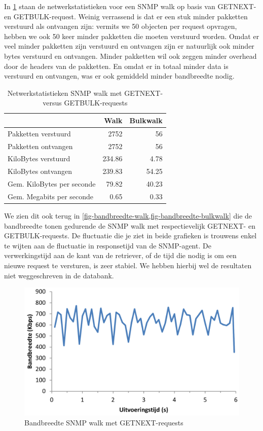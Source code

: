 In \cref{tabel-bandbreedte-walk-vs-bulk} staan de netwerkstatistieken voor een SNMP walk op basis van GETNEXT- en GETBULK-request.
Weinig verrassend is dat er een stuk minder pakketten verstuurd als ontvangen zijn:
vermits we 50 objecten per request opvragen, hebben we ook 50 keer minder pakketten die moeten verstuurd worden.
Omdat er veel minder pakketten zijn verstuurd en ontvangen zijn er natuurlijk ook minder bytes verstuurd en ontvangen.
Minder pakketten wil ook zeggen minder overhead door de headers van de pakketten.
En omdat er in totaal minder data is verstuurd en ontvangen, was er ook gemiddeld minder bandbreedte nodig.


\begin{table}[h]
\centering
\begin{tabular}{@{}lrr@{}}
\toprule
                           & Walk   & Bulkwalk \\ \midrule
Pakketten verstuurd        & 2752   & 56       \\
Pakketten ontvangen        & 2752   & 56       \\
KiloBytes verstuurd        & 234.86 & 4.78     \\
KiloBytes ontvangen        & 239.83 & 54.25    \\
Gem. KiloBytes per seconde & 79.82  & 40.23    \\
Gem. Megabits per seconde  & 0.65   & 0.33     \\ \bottomrule
\end{tabular}
\caption{Netwerkstatistieken SNMP walk met GETNEXT- versus GETBULK-requests}
\label{tabel-bandbreedte-walk-vs-bulk}
\end{table}

We zien dit ook terug in \cref{fig-bandbreedte-walk,fig-bandbreedte-bulkwalk} die de bandbreedte tonen gedurende
de SNMP walk met respectievelijk GETNEXT- en GETBULK-requests.
De fluctuatie die je ziet in beide grafieken is trouwens enkel te wijten aan de fluctuatie in responsetijd van de SNMP-agent.
De verwerkingstijd aan de kant van de retriever, of de tijd die nodig is om een nieuwe request te versturen, is zeer stabiel.
We hebben hierbij wel de resultaten niet weggeschreven in de databank.

\begin{figure}[h]
	\centering
	\includegraphics[scale=0.40]{figures/bandbreedte/snmpwalk}
	\caption{Bandbreedte SNMP walk met GETNEXT-requests}
	\label{fig-bandbreedte-walk}
\end{figure}

